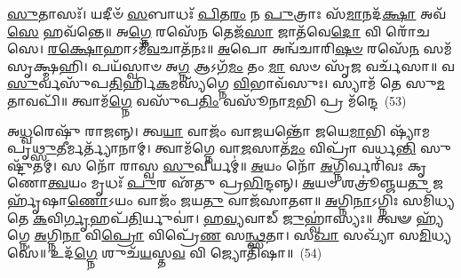 \-\ul{𑌸𑍁}\-𑌤𑌾𑌸𑌃᳴। 𑌯𑌦𑍀𑍞᳴ \ul{𑌸}\-𑌬𑌾𑌧𑌃᳴ \ul{𑌪𑌿}\-𑌤\-\ul{𑌰𑌂} 𑌨 \ul{𑌪𑍁}\-𑌤𑍍𑌰𑌾𑌃 𑌸᳴\-\ul{𑌮𑌾}\-𑌨𑌦᳴\-\ul{𑌕𑍍𑌷𑌾} 𑌅𑌵᳴\-\ul{𑌸𑍇} 𑌹𑌵᳴𑌨𑍍𑌤𑍇॥ 𑌅\-\ul{𑌗𑍍𑌨𑍇} 𑌰𑌸𑍇᳴\-\ul{𑌨} 𑌤𑍇𑌜᳴\-\ul{𑌸𑌾} 𑌜𑌾𑌤᳴𑌵𑍇\-\ul{𑌦𑍋} 𑌵𑌿 𑌰𑍋᳴𑌚𑌸𑍇। \ul{𑌰}\-\-\ul{𑌕𑍍𑌷𑍋}\-𑌹𑌾\-𑌽𑌮𑍀᳴\-\ul{𑌵}\-𑌚𑌾𑌤᳴𑌨𑌃॥ \ul{𑌅}\-𑌪𑍋 𑌅𑌨𑍍𑌵᳴𑌚𑌾𑌰𑌿\-\ul{𑌷}\-\-\ul{𑍞} 𑌰𑌸𑍇᳴\-\ul{𑌨} 𑌸𑌮᳴𑌸𑍃𑌕𑍍𑌷𑍍𑌮𑌹𑌿। 𑌪𑌯᳴𑌸𑍍𑌵𑌾𑍞 𑌅\-\ul{𑌗𑍍𑌨} 𑌆\-𑌽𑌗᳴\-\ul{𑌮𑌂} 𑌤𑌂 \ul{𑌮𑌾} 𑌸𑍞 𑌸𑍃᳴\-\ul{𑌜} 𑌵𑌰𑍍𑌚᳴𑌸𑌾॥ 𑌵\-\ul{𑌸𑍁}\-𑌰𑍍𑌵𑌸𑍁᳴𑌪\-\ul{𑌤𑌿}\-𑌰𑍍\mbox{}𑌹𑌿\-\ul{𑌕}\-𑌮𑌸𑍍𑌯᳴𑌗𑍍𑌨𑍇 \ul{𑌵𑌿}\-𑌭𑌾𑌵᳴𑌸𑍁𑌃। 𑌸𑍍𑌯𑌾𑌮᳴ 𑌤𑍇 𑌸𑍁\-\ul{𑌮}\-𑌤𑌾𑌵𑌪𑌿᳴॥ 𑌤𑍍𑌵𑌾𑌮᳴\-\ul{𑌗𑍍𑌨𑍇} 𑌵𑌸𑍁᳴𑌪\-\ul{𑌤𑌿𑌂} 𑌵𑌸𑍂᳴𑌨𑌾\-\ul{𑌮}\-𑌭𑌿 𑌪𑍍𑌰 𑌮᳴𑌨𑍍𑌦𑍇~(53)

𑌅\-\ul{𑌧𑍍𑌵}\-𑌰𑍇𑌷𑍁᳴ 𑌰𑌾𑌜𑌨𑍍𑌨𑍍। 𑌤𑍍𑌵\-\ul{𑌯𑌾} 𑌵𑌾𑌜𑌂᳴ 𑌵𑌾\-\ul{𑌜}\-𑌯𑌨𑍍𑌤𑍋᳴ 𑌜𑌯𑍇\-\ul{𑌮𑌾}\-𑌭𑌿 𑌷𑍍𑌯𑌾᳴𑌮 𑌪𑍃\-\ul{𑌥𑍍𑌸𑍁}\-𑌤𑍀𑌰𑍍𑌮𑌰𑍍𑌤𑍍𑌯𑌾᳴𑌨𑌾𑌮𑍍। 𑌤𑍍𑌵𑌾𑌮᳴𑌗𑍍𑌨𑍇 𑌵𑌾\-\ul{𑌜}\-𑌸𑌾𑌤᳴\-\ul{𑌮𑌂} 𑌵𑌿𑌪𑍍𑌰𑌾᳴ 𑌵𑌰𑍍𑌧\-\ul{𑌨𑍍𑌤𑌿} 𑌸𑍁𑌷𑍍𑌟𑍁᳴𑌤𑌮𑍍। 𑌸 𑌨𑍋᳴ 𑌰𑌾𑌸𑍍𑌵 \ul{𑌸𑍁}\-𑌵𑍀𑌰𑍍𑌯𑌮𑍍॑॥ \ul{𑌅}\-𑌯𑌂 𑌨𑍋᳴ \ul{𑌅}\-𑌗𑍍𑌨𑌿𑌰𑍍𑌵𑌰𑌿᳴𑌵𑌃 𑌕𑍃𑌣𑍋\-\ul{𑌤𑍍𑌵}\-𑌯𑌂 𑌮𑍃𑌧𑌃᳴ \ul{𑌪𑍁}\-𑌰 𑌏᳴𑌤𑍁 𑌪𑍍𑌰\-\ul{𑌭𑌿}\-𑌨𑍍𑌦𑌨𑍍𑌨𑍍। \ul{𑌅}\-𑌯𑍞 𑌶𑌤𑍍𑌰𑍂॑𑌞𑍍𑌜𑌯\-\ul{𑌤𑍁} 𑌜𑌰𑍍\mbox{}𑌹𑍃᳴𑌷𑌾\-\ul{𑌣𑍋}\-\-𑌽𑌯𑌂 𑌵𑌾𑌜𑌂᳴ 𑌜𑌯\-\ul{𑌤𑍁} 𑌵𑌾𑌜᳴𑌸𑌾𑌤𑍗॥ \ul{𑌅}\-𑌗𑍍𑌨𑌿\-\ul{𑌨𑌾}\-𑌽𑌗𑍍𑌨𑌿𑌃 𑌸𑌮𑌿᳴𑌧𑍍𑌯𑌤𑍇 \ul{𑌕}\-𑌵𑌿\-\ul{𑌰𑍍𑌗𑍃}\-𑌹𑌪᳴\-\ul{𑌤𑌿}\-𑌰𑍍𑌯𑍁𑌵𑌾॑। \ul{𑌹}\-\-\ul{𑌵𑍍𑌯}\-𑌵𑌾𑌡𑍍 \ul{𑌜𑍁}\-𑌹𑍍𑌵𑌾॑𑌸𑍍𑌯𑌃॥ 𑌤𑍍𑌵𑍟 𑌹𑍍𑌯᳴𑌗𑍍𑌨𑍇 \ul{𑌅}\-𑌗𑍍𑌨𑌿\-\ul{𑌨𑌾} 𑌵𑌿\-\ul{𑌪𑍍𑌰𑍋} 𑌵𑌿𑌪𑍍𑌰𑍇᳴\-\ul{𑌣} 𑌸\-\ul{𑌨𑍍𑌥𑍍𑌸}\-𑌤𑌾। 𑌸\-\ul{𑌖𑌾} 𑌸𑌖𑍍𑌯𑌾᳴ 𑌸\-\ul{𑌮𑌿}\-𑌧𑍍𑌯𑌸𑍇॑॥ 𑌉𑌦᳴\-\ul{𑌗𑍍𑌨𑍇} 𑌶𑍁𑌚᳴\-\ul{𑌯}\-𑌸𑍍𑌤\-\ul{𑌵} 𑌵𑌿 𑌜𑍍𑌯𑍋𑌤𑌿᳴𑌷𑌾॥~(54)

{\anuvakamend[{\-\ul{𑌮}\-𑌘𑌵𑌾᳴𑌨𑌂 𑌮\-\ul{𑌨𑍍𑌦𑍇} 𑌹𑍍𑌯᳴\-\ul{𑌗𑍍𑌨𑍇} 𑌚𑌤𑍁᳴𑌰𑍍𑌦𑌶 𑌚}]}%
